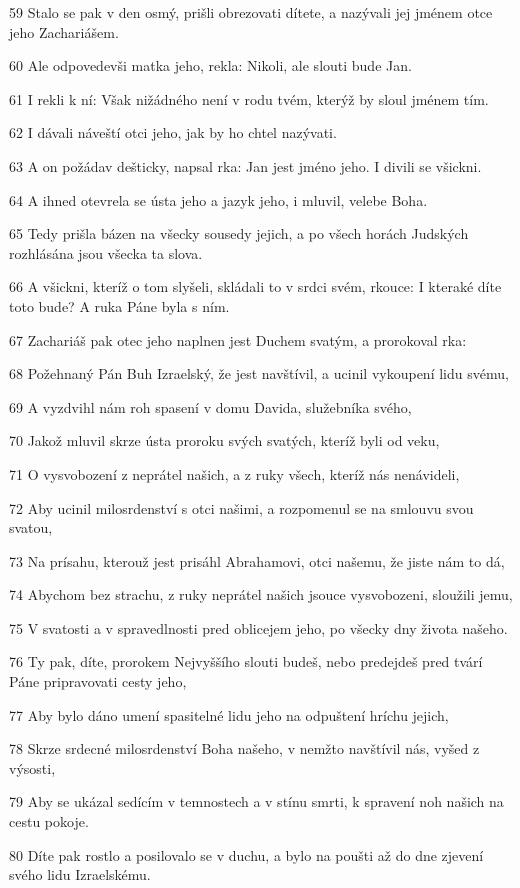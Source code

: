 \par 59 Stalo se pak v den osmý, prišli obrezovati dítete, a nazývali jej jménem otce jeho Zachariášem.
\par 60 Ale odpovedevši matka jeho, rekla: Nikoli, ale slouti bude Jan.
\par 61 I rekli k ní: Však nižádného není v rodu tvém, kterýž by sloul jménem tím.
\par 62 I dávali náveští otci jeho, jak by ho chtel nazývati.
\par 63 A on požádav dešticky, napsal rka: Jan jest jméno jeho. I divili se všickni.
\par 64 A ihned otevrela se ústa jeho a jazyk jeho, i mluvil, velebe Boha.
\par 65 Tedy prišla bázen na všecky sousedy jejich, a po všech horách Judských rozhlásána jsou všecka ta slova.
\par 66 A všickni, kteríž o tom slyšeli, skládali to v srdci svém, rkouce: I kteraké díte toto bude? A ruka Páne byla s ním.
\par 67 Zachariáš pak otec jeho naplnen jest Duchem svatým, a prorokoval rka:
\par 68 Požehnaný Pán Buh Izraelský, že jest navštívil, a ucinil vykoupení lidu svému,
\par 69 A vyzdvihl nám roh spasení v domu Davida, služebníka svého,
\par 70 Jakož mluvil skrze ústa proroku svých svatých, kteríž byli od veku,
\par 71 O vysvobození z neprátel našich, a z ruky všech, kteríž nás nenávideli,
\par 72 Aby ucinil milosrdenství s otci našimi, a rozpomenul se na smlouvu svou svatou,
\par 73 Na prísahu, kterouž jest prisáhl Abrahamovi, otci našemu, že jiste nám to dá,
\par 74 Abychom bez strachu, z ruky neprátel našich jsouce vysvobozeni, sloužili jemu,
\par 75 V svatosti a v spravedlnosti pred oblicejem jeho, po všecky dny života našeho.
\par 76 Ty pak, díte, prorokem Nejvyššího slouti budeš, nebo predejdeš pred tvárí Páne pripravovati cesty jeho,
\par 77 Aby bylo dáno umení spasitelné lidu jeho na odpuštení hríchu jejich,
\par 78 Skrze srdecné milosrdenství Boha našeho, v nemžto navštívil nás, vyšed z výsosti,
\par 79 Aby se ukázal sedícím v temnostech a v stínu smrti, k spravení noh našich na cestu pokoje.
\par 80 Díte pak rostlo a posilovalo se v duchu, a bylo na poušti až do dne zjevení svého lidu Izraelskému.

